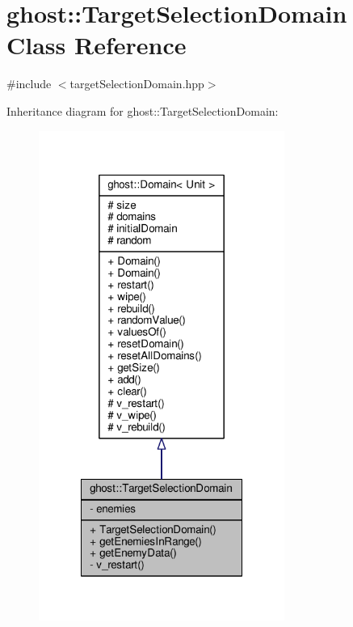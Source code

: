\hypertarget{classghost_1_1TargetSelectionDomain}{\section{ghost\-:\-:Target\-Selection\-Domain Class Reference}
\label{classghost_1_1TargetSelectionDomain}
}


{\ttfamily \#include $<$target\-Selection\-Domain.\-hpp$>$}



Inheritance diagram for ghost\-:\-:Target\-Selection\-Domain\-:
\nopagebreak
\begin{figure}[H]
\begin{center}
\leavevmode
\includegraphics[width=228pt]{classghost_1_1TargetSelectionDomain__inherit__graph}
\end{center}
\end{figure}


